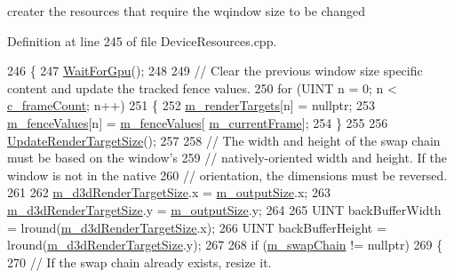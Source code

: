 creater the resources that require the wqindow size to be changed 



Definition at line 245 of file Device\+Resources.\+cpp.


\begin{DoxyCode}
246 \{
247     \mbox{\hyperlink{class_d_x_1_1_device_resources_a53d3cb840dfc40ef2eecfd993740447f}{WaitForGpu}}();
248 
249     \textcolor{comment}{// Clear the previous window size specific content and update the tracked fence values.}
250     \textcolor{keywordflow}{for} (UINT n = 0; n < \mbox{\hyperlink{namespace_d_x_a13eecb6f150dc97fc5c7c8597377d0fb}{c\_frameCount}}; n++)
251     \{
252         \mbox{\hyperlink{class_d_x_1_1_device_resources_aa96cf4622c1a948b53dfd6f1a08a24cd}{m\_renderTargets}}[n] = \textcolor{keyword}{nullptr};
253         \mbox{\hyperlink{class_d_x_1_1_device_resources_a393281583e4e020d7a2d05c060c588a8}{m\_fenceValues}}[n] = \mbox{\hyperlink{class_d_x_1_1_device_resources_a393281583e4e020d7a2d05c060c588a8}{m\_fenceValues}}[
      \mbox{\hyperlink{class_d_x_1_1_device_resources_ac5373e60722eaa25c1068aa754b501fa}{m\_currentFrame}}];
254     \}
255 
256     \mbox{\hyperlink{class_d_x_1_1_device_resources_a7adaa47153e97fbbcc524013905635f0}{UpdateRenderTargetSize}}();
257 
258     \textcolor{comment}{// The width and height of the swap chain must be based on the window's}
259     \textcolor{comment}{// natively-oriented width and height. If the window is not in the native}
260     \textcolor{comment}{// orientation, the dimensions must be reversed.}
261 
262     \mbox{\hyperlink{class_d_x_1_1_device_resources_a8ee855b75ab68a9fcc5f3564403cf8f8}{m\_d3dRenderTargetSize}}.x = \mbox{\hyperlink{class_d_x_1_1_device_resources_aa102e231efe8bb03f3a91728f8477d08}{m\_outputSize}}.x;
263     \mbox{\hyperlink{class_d_x_1_1_device_resources_a8ee855b75ab68a9fcc5f3564403cf8f8}{m\_d3dRenderTargetSize}}.y = \mbox{\hyperlink{class_d_x_1_1_device_resources_aa102e231efe8bb03f3a91728f8477d08}{m\_outputSize}}.y;
264 
265     UINT backBufferWidth = lround(\mbox{\hyperlink{class_d_x_1_1_device_resources_a8ee855b75ab68a9fcc5f3564403cf8f8}{m\_d3dRenderTargetSize}}.x);
266     UINT backBufferHeight = lround(\mbox{\hyperlink{class_d_x_1_1_device_resources_a8ee855b75ab68a9fcc5f3564403cf8f8}{m\_d3dRenderTargetSize}}.y);
267 
268     \textcolor{keywordflow}{if} (\mbox{\hyperlink{class_d_x_1_1_device_resources_a8f067c81561cd51ac8e59a89e868571b}{m\_swapChain}} != \textcolor{keyword}{nullptr})
269     \{
270         \textcolor{comment}{// If the swap chain already exists, resize it.}

\end{DoxyCode}
